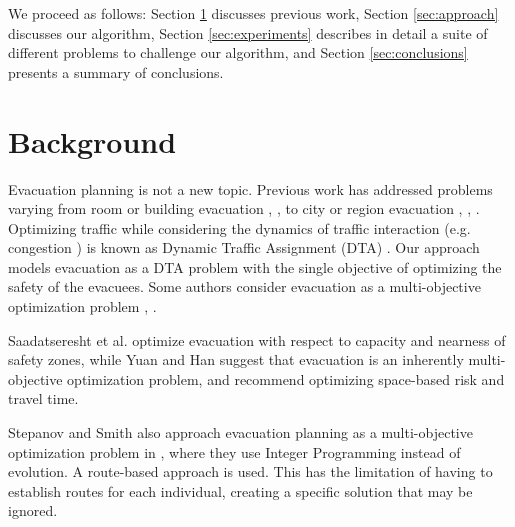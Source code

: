\documentclass{sig-alternate-05-2015}
\begin{document}
We proceed as follows: Section \ref{sec:background} discusses previous
work, Section \ref{sec:approach}
discusses our algorithm, Section \ref{sec:experiments} describes in
detail a suite of different problems to challenge our algorithm,
and Section \ref{sec:conclusions} presents a summary of conclusions.

\section{Background}\label{sec:background}
Evacuation planning is not a new topic. Previous work has
addressed problems varying from room or building evacuation
\cite{thompson1995computer}, \cite{gwynne1999review}, to city or region evacuation
\cite{bazzan2014evolutionary}, \cite{chiu2004traffic}, \cite{lu2004capacity}.
Optimizing traffic while considering the dynamics of traffic interaction
(e.g. congestion \cite{chiu2011dynamic}) is known
as Dynamic Traffic Assignment (DTA) \cite{peeta2001foundations}.
Our approach models evacuation as a DTA problem with the single objective of 
optimizing the safety of the evacuees.
Some authors consider evacuation as a multi-objective
optimization problem \cite{saadatseresht2009evacuation},
\cite{yuan2010multi}.

Saadatseresht et al. optimize evacuation with respect to capacity and
nearness of safety zones, while Yuan and Han suggest that evacuation is
an inherently multi-objective optimization problem, and recommend
optimizing space-based risk and travel time.



Stepanov and Smith also approach evacuation planning as a
multi-objective optimization problem in
\cite{stepanov2009multi}, where they use Integer Programming
instead of evolution.  A route-based approach is
used.  This has the limitation of having to establish routes for each
individual, creating a specific solution that may be ignored.
\end{document}
